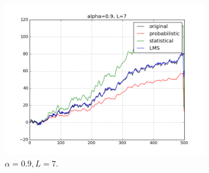 \begin{enumerate}[(a)]
\begin{figure}[htbp]
	\centering
	\includegraphics[width=0.8\textwidth]{images/p5-6}
	\caption{$\alpha=0.9, L=7$.}
	\label{fig:p5-6}
\end{figure}

\end{enumerate}

\newpage